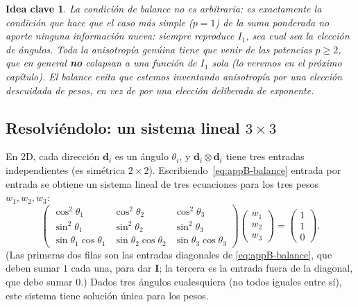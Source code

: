 \documentclass[11pt,a4paper]{article}
\newtheorem{takeaway}{Idea clave}
\begin{document}
\begin{takeaway}
La condici\'on de balance no es arbitraria: es exactamente la
condici\'on que hace que el caso m\'as simple ($p=1$) de la suma
ponderada no aporte \emph{ninguna} informaci\'on nueva: siempre
reproduce $I_1$, sea cual sea la elecci\'on de \'angulos. Toda la
anisotrop\'ia gen\'uina tiene que venir de las potencias $p\geq2$, que
en general \textbf{no} colapsan a una funci\'on de $I_1$ sola (lo
veremos en el pr\'oximo cap\'itulo). El balance evita que estemos
inventando anisotrop\'ia por una elecci\'on descuidada de pesos, en
vez de por una elecci\'on deliberada de exponente.
\end{takeaway}

\subsection{Resolvi\'endolo: un sistema lineal $3\times3$}

En 2D, cada direcci\'on $\bm d_i$ es un \'angulo $\theta_i$, y
$\bm d_i\otimes\bm d_i$ tiene tres entradas independientes (es
sim\'etrica $2\times2$). Escribiendo~\eqref{eq:appB-balance} entrada
por entrada se obtiene un sistema lineal de tres ecuaciones para los
tres pesos $w_1,w_2,w_3$:
\begin{equation}
 \begin{pmatrix}
 \cos^2\theta_1 & \cos^2\theta_2 & \cos^2\theta_3\\
 \sin^2\theta_1 & \sin^2\theta_2 & \sin^2\theta_3\\
 \sin\theta_1\cos\theta_1 & \sin\theta_2\cos\theta_2 & \sin\theta_3\cos\theta_3
 \end{pmatrix}
 \begin{pmatrix}w_1\\w_2\\w_3\end{pmatrix}
 =\begin{pmatrix}1\\1\\0\end{pmatrix}.
 \label{eq:appB-balance-system}
\end{equation}
(Las primeras dos filas son las entradas diagonales de
\eqref{eq:appB-balance}, que deben sumar $1$ cada una, para dar
$\bm I$; la tercera es la entrada fuera de la diagonal, que debe
sumar $0$.) Dados tres \'angulos cualesquiera (no todos iguales entre
s\'i), este sistema tiene soluci\'on \'unica para los pesos.
\end{document}
